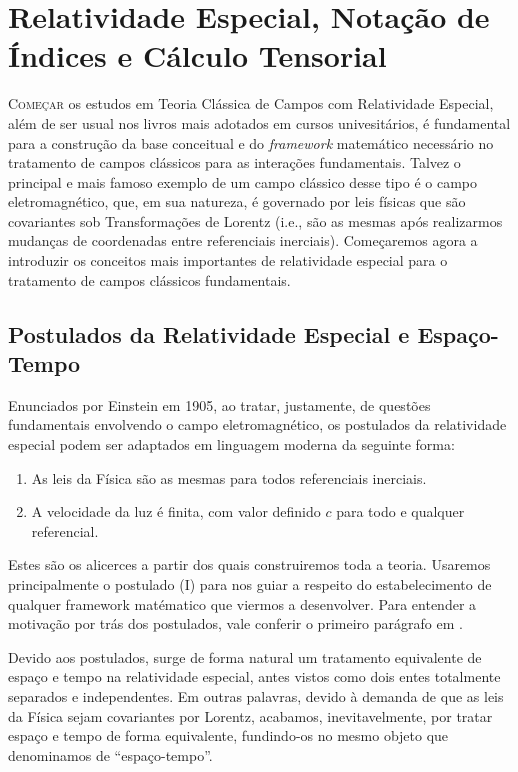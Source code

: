 \documentclass[12pt,a4paper]{article}
\begin{document}
\tableofcontents %
\newpage %

\section{Relatividade Especial, Notação de Índices e Cálculo Tensorial}

\lettrine[lines=3, nindent=0.1em]{\capitular{}C}{omeçar} os estudos
em Teoria Clássica de Campos com Relatividade Especial, além de ser usual nos livros mais adotados
em cursos univesitários, é fundamental para a construção da base conceitual e do \textit{framework}
matemático necessário no tratamento de campos clássicos para as interações fundamentais.
Talvez o principal e mais famoso exemplo de um campo clássico desse tipo é o campo eletromagnético, que,
em sua natureza, é governado por leis físicas que são covariantes sob Transformações de Lorentz
(i.e., são as mesmas após realizarmos mudanças de coordenadas entre referenciais inerciais).
Começaremos agora a introduzir os conceitos mais importantes de relatividade especial para o tratamento de
campos clássicos fundamentais.

\subsection{Postulados da Relatividade Especial e Espaço-Tempo}
Enunciados por Einstein em 1905, ao tratar, justamente,
de questões fundamentais envolvendo o campo eletromagnético\cite{einstein1905}, os postulados da relatividade
especial podem ser adaptados em linguagem moderna da seguinte forma:
\begin{enumerate}[label=\Roman*.]
  \item As leis da Física são as mesmas para todos referenciais inerciais.
  \item A velocidade da luz é finita, com valor definido $c$ para todo e qualquer referencial.
\end{enumerate}

Estes são os alicerces a partir dos quais construiremos toda a teoria. Usaremos principalmente o postulado (I)
para nos guiar a respeito do estabelecimento de qualquer framework matématico que viermos a desenvolver. Para
entender a motivação por trás dos postulados, vale conferir o primeiro parágrafo em \cite{einstein1905}.

Devido aos postulados, surge de forma natural um tratamento equivalente de espaço e tempo na relatividade
especial, antes vistos como dois entes totalmente separados e independentes. Em outras palavras, devido à demanda
de que as leis da Física sejam covariantes por Lorentz, acabamos, inevitavelmente, por tratar espaço e tempo de
forma equivalente, fundindo-os no mesmo objeto que denominamos de \enquote{espaço-tempo}. 
\end{document}
